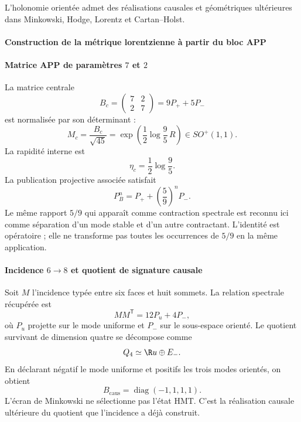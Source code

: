 \noindent L'holonomie orientée admet des réalisations causales et géométriques ultérieures dans Minkowski, Hodge, Lorentz et Cartan--Holst.\par\medskip

\paragraph{Construction de la métrique lorentzienne à partir du bloc APP}

\paragraph{Matrice APP de paramètres \(7\) et \(2\)}

La matrice centrale
\begin{equation}
B_c=\begin{pmatrix}7&2\\2&7\end{pmatrix}
=9P_++5P_-
\label{eq:Bc}
\end{equation}
est normalisée par son déterminant :
\begin{equation}
M_c=\frac{B_c}{\sqrt{45}}
=\exp\left(\frac12\log\frac95\,R\right)
\in SO^+(1,1).
\label{eq:Mc}
\end{equation}
La rapidité interne est
\[
\eta_c=\frac12\log\frac95.
\]
La publication projective associée satisfait
\begin{equation}
P_B^n=P_++\left(\frac59\right)^nP_-.
\label{eq:PB-contract}
\end{equation}
Le même rapport \(5/9\) qui apparaît comme contraction spectrale est reconnu ici
comme séparation d'un mode stable et d'un autre contractant. L'identité est
opératoire ; elle ne transforme pas toutes les occurrences de \(5/9\) en la même application.

\paragraph{Incidence \(6\to8\) et quotient de signature causale}

Soit \(M\) l'incidence typée entre six faces et huit sommets. La relation
spectrale récupérée est
\begin{equation}
MM^{\mathsf T}=12P_u+4P_-,
\label{eq:MMt}
\end{equation}
où \(P_u\) projette sur le mode uniforme et \(P_-\) sur le sous-espace
orienté. Le quotient survivant de dimension quatre se décompose comme
\begin{equation}
Q_4\simeq\R u\oplus E_-.
\label{eq:radion-Q4}
\end{equation}
En déclarant négatif le mode uniforme et positifs les trois modes orientés,
on obtient
\begin{equation}
B_{\mathrm{caus}}=\operatorname{diag}(-1,1,1,1).
\label{eq:minkowski}
\end{equation}
L'écran de Minkowski ne sélectionne pas l'état HMT. C'est la réalisation
causale ultérieure du quotient que l'incidence a déjà construit.

